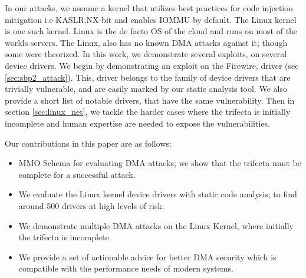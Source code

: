 In our attacks, we assume a kernel that utilizes best practices for code injection mitigation i.e KASLR,NX-bit and enables IOMMU by default. The Linux kernel is one such kernel. Linux is the de facto OS of the cloud and runs on most of the worlds servers. The Linux, also has no known DMA attacks against it; though some were theorized\cite{MMT16,thunder}. In this work, we demonstrate several exploits, on several device drivers. We begin by demonstrating an exploit on the Firewire, \spb driver (sec \ref{sec:sbp2_attack}). This, driver belongs to the family of device drivers that are trivially vulnerable, and are easily marked by our static analysis tool. We also provide a short list of notable drivers, that have the same vulnerability. Then in section \ref{sec:linux_net}, we tackle the harder cases where the trifecta is initially incomplete and human expertise are needed to expose the vulnerabilities.

Our contributions in this paper are as follows:
\begin{itemize}
    \item MMO Schema for evaluating DMA attacks; we show that the trifecta must be complete for a successful attack. 
    \item We evaluate the Linux kernel device drivers with static code analysis; to find around 500 drivers at high levels of risk.
    \item We demonstrate multiple DMA attacks on the Linux Kernel, where initially the trifecta is incomplete. 
    \item We provide a set of actionable advice for better DMA security which is compatible with the performance needs of modern systems.
\end{itemize}
